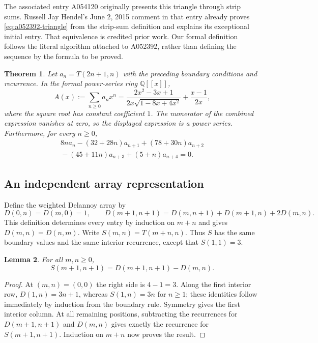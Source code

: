 \documentclass[11pt]{article}
\newtheorem{theorem}{Theorem}[section]
\newtheorem{lemma}[theorem]{Lemma}
\begin{document}
The associated entry A054120 originally presents this triangle through
strip sums. Russell Jay Hendel's June 2, 2015 comment in that entry already
proves \eqref{eq:a052392-triangle} from the strip-sum definition and
explains its exceptional initial entry. That equivalence is credited
prior work. Our formal definition follows the literal algorithm attached
to A052392, rather than defining the sequence by the formula to be proved.

\begin{theorem}\label{thm:a052392-main}
Let $a_n=T(2n+1,n)$ with the preceding boundary conditions and recurrence.
In the formal power-series ring $\mathbb Q[[x]]$,
\begin{equation}\label{eq:a052392-gf}
 A(x):=\sum_{n\ge0}a_nx^n
 =\frac{2x^2-3x+1}{2x\sqrt{1-8x+4x^2}}+\frac{x-1}{2x},
\end{equation}
where the square root has constant coefficient $1$. The numerator of
the combined expression vanishes at zero, so the displayed expression
is a power series. Furthermore, for every $n\ge0$,
\begin{equation}\label{eq:a052392-rec}
\begin{split}
 8na_n-(32+28n)a_{n+1}+(78+30n)a_{n+2}\\
 {}-(45+11n)a_{n+3}+(5+n)a_{n+4}=0.
\end{split}
\end{equation}
\end{theorem}

\subsection{An independent array representation}

Define the weighted Delannoy array by
\[
 D(0,n)=D(m,0)=1,\qquad
 D(m+1,n+1)=D(m,n+1)+D(m+1,n)+2D(m,n).
\]
This definition determines every entry by induction on $m+n$ and gives
$D(m,n)=D(n,m)$. Write $S(m,n)=T(m+n,n)$. Thus $S$ has the same boundary
values and the same interior recurrence, except that $S(1,1)=3$.

\begin{lemma}\label{lem:a052392-difference}
For all $m,n\ge0$,
\[
 S(m+1,n+1)=D(m+1,n+1)-D(m,n).
\]
\end{lemma}
\begin{proof}
At $(m,n)=(0,0)$ the right side is $4-1=3$. Along the first interior
row, $D(1,n)=3n+1$, whereas $S(1,n)=3n$ for $n\ge1$; these identities
follow immediately by induction from the boundary rule. Symmetry gives
the first interior column. At all remaining positions, subtracting the
recurrences for $D(m+1,n+1)$ and $D(m,n)$ gives exactly the recurrence
for $S(m+1,n+1)$. Induction on $m+n$ now proves the result.
\end{proof}
\end{document}
